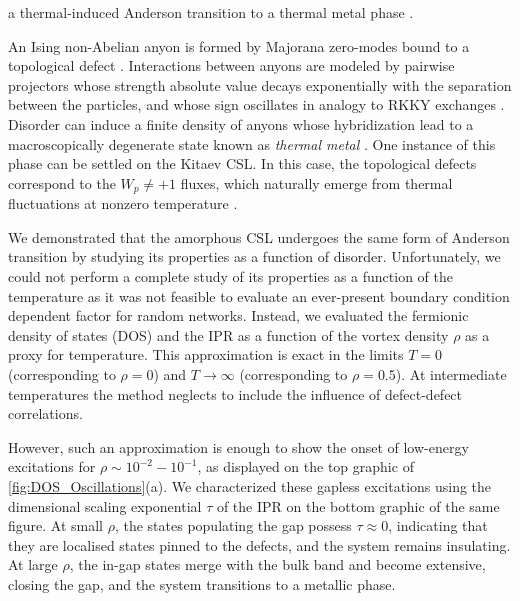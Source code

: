 a thermal-induced Anderson transition to a thermal metal phase
\autocite{selfThermallyInducedMetallic2019}.

An Ising non-Abelian anyon is formed by Majorana zero-modes bound to a
topological defect \autocite{Beenakker2013}. Interactions between anyons
are modeled by pairwise projectors whose strength absolute value decays
exponentially with the separation between the particles, and whose sign
oscillates in analogy to RKKY exchanges
\autocite{Laumann2012,Lahtinen_2011,lahtinenTopologicalLiquidNucleation2012}.
Disorder can induce a finite density of anyons whose hybridization lead
to a macroscopically degenerate state known as \emph{thermal metal}
\autocite{Laumann2012}. One instance of this phase can be settled on the
Kitaev CSL. In this case, the topological defects correspond to the
\(W_p \neq +1\) fluxes, which naturally emerge from thermal fluctuations
at nonzero temperature \autocite{selfThermallyInducedMetallic2019}.

We demonstrated that the amorphous CSL undergoes the same form of
Anderson transition by studying its properties as a function of
disorder. Unfortunately, we could not perform a complete study of its
properties as a function of the temperature as it was not feasible to
evaluate an ever-present boundary condition dependent factor
\autocite{pedrocchiPhysicalSolutionsKitaev2011,Zschocke_Physical_states2015}
for random networks. Instead, we evaluated the fermionic density of
states (DOS) and the IPR as a function of the vortex density \(\rho\) as
a proxy for temperature. This approximation is exact in the limits
\(T = 0\) (corresponding to \(\rho = 0\)) and \(T \to \infty\)
(corresponding to \(\rho = 0.5\)). At intermediate temperatures the
method neglects to include the influence of defect-defect correlations.

However, such an approximation is enough to show the onset of low-energy
excitations for \(\rho \sim 10^{-2}-10^{-1}\), as displayed on the top
graphic of
\protect\hyperlink{fig:DOS_Oscillations}{{[}fig:DOS\_Oscillations{]}}(a).
We characterized these gapless excitations using the dimensional scaling
exponential \(\tau\) of the IPR on the bottom graphic of the same
figure. At small \(\rho\), the states populating the gap possess
\(\tau\approx0\), indicating that they are localised states pinned to
the defects, and the system remains insulating. At large \(\rho\), the
in-gap states merge with the bulk band and become extensive, closing the
gap, and the system transitions to a metallic phase.

